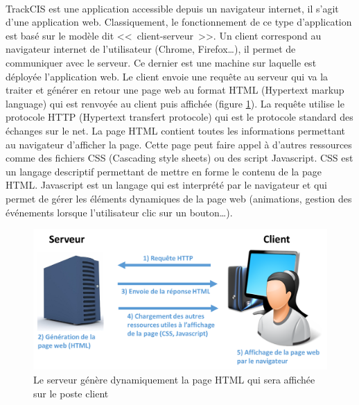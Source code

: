 			\paragraph{}%
			TrackCIS est une application accessible depuis un navigateur internet, il
			s'agit d'une application web. Classiquement, le fonctionnement de ce type
			d'application est basé sur le modèle dit <<~client-serveur~>>. Un client
			correspond au navigateur internet de l'utilisateur (Chrome, Firefox\ldots),
			il permet de communiquer avec le serveur. Ce dernier est une machine sur
			laquelle est déployée l'application web. Le client envoie une requête au
			serveur qui va la traiter et générer en retour une page web au format HTML
			(Hypertext markup language) qui est renvoyée au client puis affichée
			(figure \ref{client_serveur}). La requête utilise le protocole HTTP
			(Hypertext transfert protocole) qui est le protocole standard des échanges
			sur le net. La page HTML contient toutes les informations permettant au
			navigateur d'afficher la page. Cette page peut faire appel à d'autres
			ressources comme des fichiers CSS (Cascading style sheets) ou des script
			Javascript. CSS est un langage descriptif permettant de mettre en forme le
			contenu de la page HTML.
			Javascript est un langage qui est interprété par le navigateur et qui
			permet de gérer les éléments dynamiques de la page web (animations, gestion
			des événements lorsque l'utilisateur clic sur un bouton\ldots).
			\begin{figure}[H]
				\centering
				\includegraphics[width=14cm]{../img/part3/client_serveur.png}
				\caption{\label{client_serveur} Le serveur génère dynamiquement la page
				HTML qui sera affichée sur le poste client}
			\end{figure}
			
